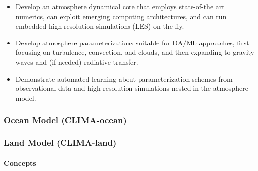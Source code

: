 \documentclass{article}
\begin{document}
\begin{itemize}
    \item Develop an atmosphere dynamical core that employs state-of-the art numerics, can exploit emerging computing architectures, and can run embedded high-resolution simulations (LES) on the fly.
    \item Develop atmosphere parameterizations suitable for DA/ML approaches, first focusing on turbulence, convection, and clouds, and then expanding to gravity waves and (if needed) radiative transfer.
    \item Demonstrate automated learning about parameterization schemes from observational data and high-resolution simulations nested in the atmosphere model.
\end{itemize}

\subsubsection{Ocean Model (CLIMA-ocean)}

\subsubsection{Land Model (CLIMA-land)}

\paragraph{Concepts}
\end{document}
